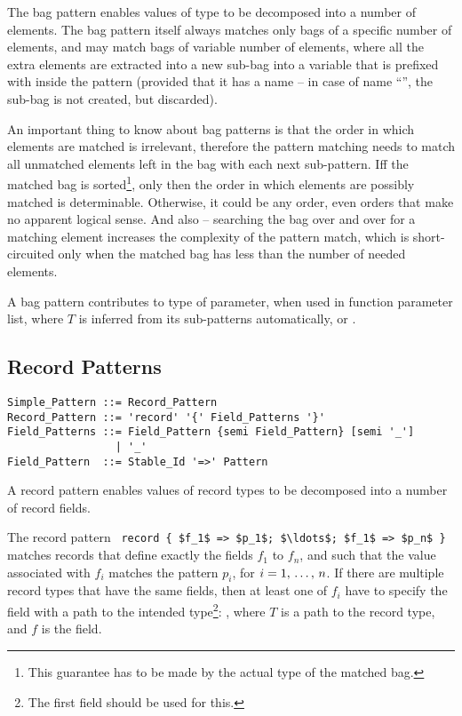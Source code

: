 The bag pattern enables values of  type to be decomposed into a number of elements. The bag pattern itself always matches only bags of a specific number of elements, and may match bags of variable number of elements, where all the extra elements are extracted into a new sub-bag into a variable that is prefixed with \code{*} inside the pattern (provided that it has a name -- in case of name ``\code{_}'', the sub-bag is not created, but discarded). 

An important thing to know about bag patterns is that the order in which elements are matched is irrelevant, therefore the pattern matching needs to match all unmatched elements left in the bag with each next sub-pattern. Iff the matched bag is sorted\footnote{This guarantee has to be made by the actual type of the matched bag.}, only then the order in which elements are possibly matched is determinable. Otherwise, it could be any order, even orders that make no apparent logical sense. And also -- searching the bag over and over for a matching element increases the complexity of the pattern match, which is short-circuited only when the matched bag has less than the number of needed elements. 

A bag pattern contributes  to type of parameter, when used in function parameter list, where $T$ is inferred from its sub-patterns automatically, or . 





\subsection{Record Patterns}
\label{sec:record-patterns}

\syntax\begin{lstlisting}
Simple_Pattern ::= Record_Pattern
Record_Pattern ::= 'record' '{' Field_Patterns '}'
Field_Patterns ::= Field_Pattern {semi Field_Pattern} [semi '_']
                 | '_'
Field_Pattern  ::= Stable_Id '=>' Pattern
\end{lstlisting}

A record pattern enables values of record types to be decomposed into a number of record fields. 

The record pattern ~\lstinline!record { $f_1$ => $p_1$; $\ldots$; $f_1$ => $p_n$ }!~ matches records that define exactly the fields $f_1$ to $f_n$, and such that the value associated with $f_i$ matches the pattern $p_i$, for $i = 1 ,\, \ldots ,\, n$. If there are multiple record types that have the same fields, then at least one of $f_i$ have to specify the field with a path to the intended type\footnote{The first field should be used for this.}: , where $T$ is a path to the record type, and $f$ is the field. 

